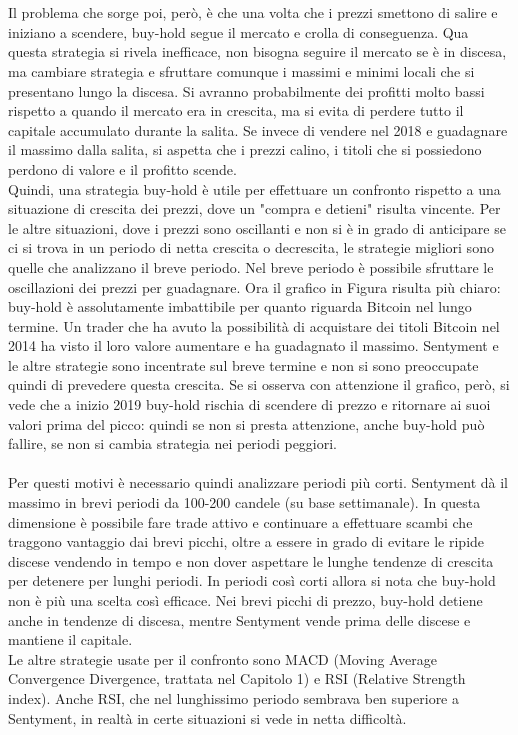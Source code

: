 \documentclass[a4paper,12pt]{report}
\begin{document}
\begin{fig}
\\~\\Il problema che sorge poi, però, è che una volta che i prezzi smettono di salire e iniziano a scendere, buy-hold segue il mercato e crolla di conseguenza. Qua questa strategia si rivela inefficace, non bisogna seguire il mercato se è in discesa, ma cambiare strategia e sfruttare comunque i massimi e minimi locali che si presentano lungo la discesa. Si avranno probabilmente dei profitti molto bassi rispetto a quando il mercato era in crescita, ma si evita di perdere tutto il capitale accumulato durante la salita. Se invece di vendere nel 2018 e guadagnare il massimo dalla salita, si aspetta che i prezzi calino, i titoli che si possiedono perdono di valore e il profitto scende.\\ Quindi, una strategia buy-hold è utile per effettuare un confronto rispetto a una situazione di crescita dei prezzi, dove un "compra e detieni" risulta vincente. Per le altre situazioni, dove i prezzi sono oscillanti e non si è in grado di anticipare se ci si trova in un periodo di netta crescita o decrescita, le strategie migliori sono quelle che analizzano il breve periodo. Nel breve periodo è possibile sfruttare le oscillazioni dei prezzi per guadagnare. Ora il grafico in Figura risulta più chiaro: buy-hold è assolutamente imbattibile per quanto riguarda Bitcoin nel lungo termine. Un trader che ha avuto la possibilità di acquistare dei titoli Bitcoin nel 2014 ha visto il loro valore aumentare e ha guadagnato il massimo. Sentyment e le altre strategie sono incentrate sul breve termine e non si sono preoccupate quindi di prevedere questa crescita. Se si osserva con attenzione il grafico, però, si vede che a inizio 2019 buy-hold rischia di scendere di prezzo e ritornare ai suoi valori prima del picco: quindi se non si presta attenzione, anche buy-hold può fallire, se non si cambia strategia nei periodi peggiori.\\~\\ Per questi motivi è necessario quindi analizzare periodi più corti. Sentyment dà il massimo in brevi periodi da 100-200 candele (su base settimanale). In questa dimensione è possibile fare trade attivo e continuare a effettuare scambi che traggono vantaggio dai brevi picchi, oltre a essere in grado di evitare le ripide discese vendendo in tempo e non dover aspettare le lunghe tendenze di crescita per detenere per lunghi periodi. In periodi così corti allora si nota che buy-hold non è più una scelta così efficace. Nei brevi picchi di prezzo, buy-hold detiene anche in tendenze di discesa, mentre Sentyment vende prima delle discese e mantiene il capitale.\\ Le altre strategie usate per il confronto sono MACD (Moving Average Convergence Divergence, trattata nel Capitolo 1) e RSI (Relative Strength index). Anche RSI, che nel lunghissimo periodo sembrava ben superiore a Sentyment, in realtà in certe situazioni si vede in netta difficoltà.\\~\\

\end{fig}
\end{document}
